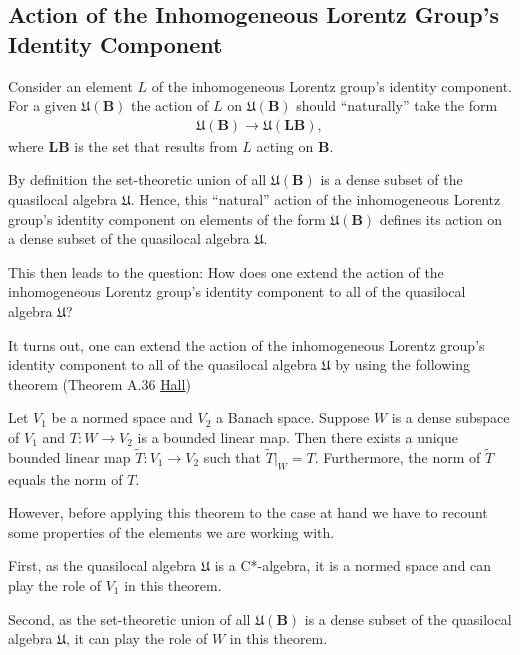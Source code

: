 \subsection{Action of the Inhomogeneous Lorentz Group's Identity Component}\label{subsec:action-of-the-inhomogeneous-lorentz-groups-identity-component}
Consider an element $L$ of the inhomogeneous Lorentz group's identity component. For a given $\mathfrak{U}(\mathbf{B})$ the action of $L$ on $\mathfrak{U}(\mathbf{B})$ should ``naturally'' take the form
\begin{align}
\mathfrak{U}(\mathbf{B}) \rightarrow \mathfrak{U}(\mathbf{LB}),
\end{align}
where $\mathbf{LB}$ is the set that results from $L$ acting on $\mathbf{B}$.

By definition the set-theoretic union of all $\mathfrak{U}(\mathbf{B})$ is a dense subset of the quasilocal algebra $\mathfrak{U}$. Hence, this ``natural'' action of the inhomogeneous Lorentz group's identity component on elements of the form $\mathfrak{U}(\mathbf{B})$ defines its action on a dense subset of the quasilocal algebra $\mathfrak{U}$.

This then leads to the question: How does one extend the action of the inhomogeneous Lorentz group's identity component to all of the quasilocal algebra $\mathfrak{U}$?

It turns out, one can extend the action of the inhomogeneous Lorentz group's identity component to all of the quasilocal algebra $\mathfrak{U}$ by using the following theorem (Theorem A.36 \href{https://doi.org/10.1007/978-1-4614-7116-5}{Hall})
\begin{theorem}
Let $V_1$ be a normed space and $V_2$ a Banach space. Suppose $W$ is a dense subspace of $V_1$ and $T: W \rightarrow V_2$ is a bounded linear map. Then there exists a unique bounded linear map $\widetilde{T}: V_1 \rightarrow V_2$ such that $\widetilde{T}|_W = T$. Furthermore, the norm of $\widetilde{T}$ equals the norm of $T$.
\end{theorem}
\noindent However, before applying this theorem to the case at hand we have to recount some properties of the elements we are working with.

First, as the quasilocal algebra $\mathfrak{U}$ is a C*-algebra, it is a normed space and can play the role of $V_1$ in this theorem.

Second, as the set-theoretic union of all $\mathfrak{U}(\mathbf{B})$ is a dense subset of the quasilocal algebra $\mathfrak{U}$, it can play the role of $W$ in this theorem.


